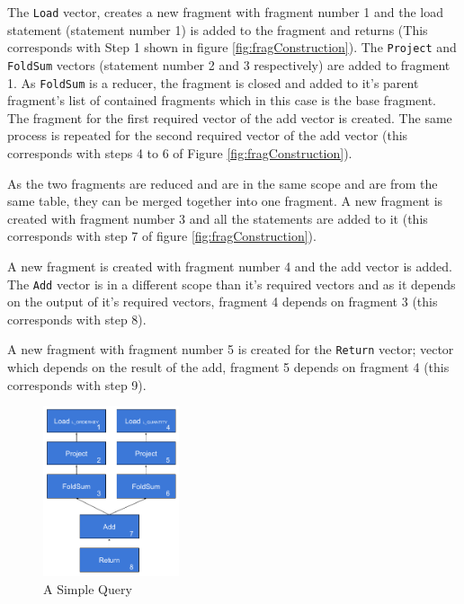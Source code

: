 The \texttt{Load} vector, creates a new fragment with fragment number 1 and the load statement (statement number 1) is added to the fragment and returns (This corresponds with Step 1 shown in figure \ref{fig:fragConstruction}). The \texttt{Project} and \texttt{FoldSum} vectors (statement number 2 and 3 respectively) are added to fragment 1. As \texttt{FoldSum} is a reducer, the fragment is closed and added to it's parent fragment's list of contained fragments which in this case is the base fragment. The fragment for the first required vector of the add vector is created. The same process is repeated for the second required vector of the add vector (this corresponds with steps 4 to 6 of Figure \ref{fig:fragConstruction}). 

As the two fragments are reduced and are in the same scope and are from the same table, they can be merged together into one fragment. A new fragment is created with fragment number 3 and all the statements are added to it (this corresponds with step 7 of figure \ref{fig:fragConstruction}). 

A new fragment is created with fragment number 4 and the add vector is added. The \texttt{Add} vector is in a different scope than it's required vectors and as it depends on the output of it's required vectors, fragment 4 depends on fragment 3 (this corresponds with step 8). 

A new fragment with fragment number 5 is created for the \texttt{Return} vector; vector which depends on the result of the add, fragment 5 depends on fragment 4 (this corresponds with step 9).

\begin{figure}[h]
\centering
\includegraphics[width=\textwidth,height=5cm,keepaspectratio]{design-and-implementation/SimpleQuery.png}
\caption{A Simple Query}
\label{fig:simpleQuery}
\end{figure}

